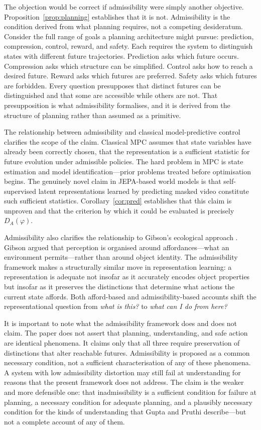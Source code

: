 \documentclass[11pt, a4paper]{article}
\theoremstyle{plain}
\theoremstyle{definition}
\theoremstyle{remark}
\newcommand{\DA}{D_A(\varphi)}
\begin{document}
The objection would be correct if admissibility were simply another objective.
Proposition~\ref{prop:planning} establishes that it is not. Admissibility is
the condition derived from what planning requires, not a competing desideratum.
Consider the full range of goals a planning architecture might pursue: prediction,
compression, control, reward, and safety. Each requires the system to distinguish
states with different future trajectories. Prediction asks which future occurs.
Compression asks which structure can be simplified. Control asks how to reach a
desired future. Reward asks which futures are preferred. Safety asks which
futures are forbidden. Every question presupposes that distinct futures can be
distinguished and that some are accessible while others are not. That
presupposition is what admissibility formalises, and it is derived from the
structure of planning rather than assumed as a primitive.

The relationship between admissibility and classical model-predictive control
\citep{mayne2000model, garcia1989model} clarifies the scope of the claim.
Classical MPC assumes that state variables have already been correctly chosen,
that the representation is a sufficient statistic for future evolution under
admissible policies. The hard problem in MPC is state estimation and model
identification---prior problems treated before optimisation begins. The genuinely
novel claim in JEPA-based world models is that self-supervised latent
representations learned by predicting masked video constitute such sufficient
statistics. Corollary~\ref{cor:pred} establishes that this claim is unproven
and that the criterion by which it could be evaluated is precisely $\DA$.

Admissibility also clarifies the relationship to Gibson's ecological approach
\citep{gibson1979ecological}. Gibson argued that perception is organised around
affordances---what an environment permits---rather than around object identity.
The admissibility framework makes a structurally similar move in representation
learning: a representation is adequate not insofar as it accurately encodes
object properties but insofar as it preserves the distinctions that determine
what actions the current state affords. Both afford-based and admissibility-based
accounts shift the representational question from \emph{what is this?} to
\emph{what can I do from here?}

It is important to note what the admissibility framework does and does not claim.
The paper does not assert that planning, understanding, and safe action are
identical phenomena. It claims only that all three require preservation of
distinctions that alter reachable futures. Admissibility is proposed as a
common necessary condition, not a sufficient characterisation of any of these
phenomena. A system with low admissibility distortion may still fail at
understanding for reasons that the present framework does not address. The claim
is the weaker and more defensible one: that inadmissibility is a sufficient
condition for failure at planning, a necessary condition for adequate planning,
and a plausibly necessary condition for the kinds of understanding that Gupta
and Pruthi describe---but not a complete account of any of them.
\end{document}

